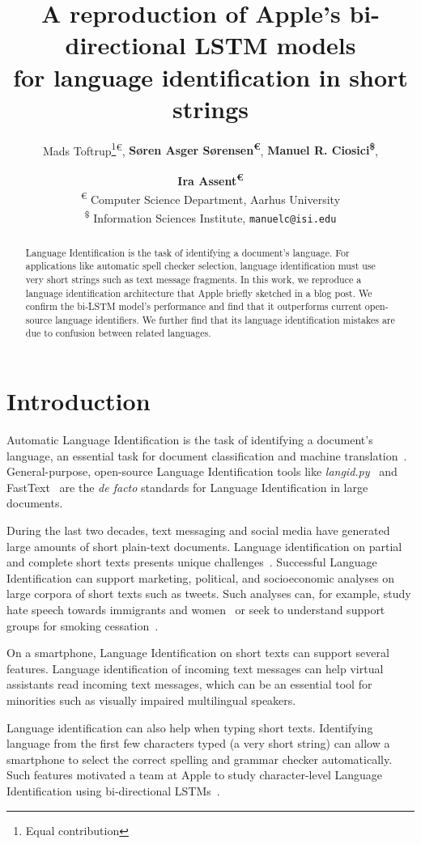 \documentclass[11pt,a4paper]{article}
\title{A reproduction of Apple's bi-directional LSTM models\\ for language identification in short strings}
\author{
    Mads Toftrup\thanks{\;\;Equal contribution}\;\;\textsuperscript{\euro},
    {\bf Søren Asger Sørensen\footnotemark[1]\;\;\textsuperscript{\euro}},
    {\bf Manuel R. Ciosici\textsuperscript{\$}}, 
    \and 
    {\bf Ira Assent\textsuperscript{\euro}} \\ 
  \textsuperscript{\euro} Computer Science Department, Aarhus University \\
  \textsuperscript{\$} Information Sciences Institute, \texttt{manuelc@isi.edu} \\
}
\date{}
\newcommand{\fasttext}{FastText\xspace}
\newcommand{\langidpy}{langid.py\xspace}
\begin{document}
\maketitle
\begin{abstract}
    
    Language Identification is the task of identifying a document's language. For applications like automatic spell checker selection, language identification must use very short strings such as text message fragments. In this work, we reproduce a language identification architecture that Apple briefly sketched in a blog post. We confirm the bi-LSTM model's performance and find that it outperforms current open-source language identifiers. We further find that its language identification mistakes are due to confusion between related languages.

\end{abstract}

\section{Introduction}

Automatic Language Identification is the task of identifying a document's language, an essential task for document classification and machine translation~\cite{ling-etal-2013-microblogs}. General-purpose, open-source Language Identification tools like \emph{\langidpy}~\cite{langidpy} and \fasttext~\cite{Grave} are the \emph{de facto} standards for Language Identification in large documents. 

During the last two decades, text messaging and social media have generated large amounts of short plain-text documents. Language identification on partial and complete short texts presents unique challenges~\cite{jauhiainen2019automatic}. Successful Language Identification can support marketing, political, and socioeconomic analyses on large corpora of short texts such as tweets. Such analyses can, for example, study hate speech towards immigrants and women~\cite{basile-etal-2019-semeval} or seek to understand support groups for smoking cessation~\cite{Prochaska447}. 

On a smartphone, Language Identification on short texts can support several features. Language identification of incoming text messages can help virtual assistants read incoming text messages, which can be an essential tool for minorities such as visually impaired multilingual speakers.

Language identification can also help when typing short texts. Identifying language from the first few characters typed (a very short string) can allow a smartphone to select the correct spelling and grammar checker automatically. Such features motivated a team at Apple to study character-level Language Identification using bi-directional LSTMs~\cite{apple}.
\end{document}
